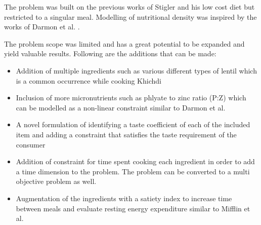 \documentclass[
]{article}
\begin{document}
The problem was built on the previous works of Stigler \cite{stigler_1945} and his low cost diet but restricted to a singular meal. 
Modelling of nutritional density was inspired by the works of Darmon et al. \cite{darmon_ferguson_briend_2002}. 

The problem scope was limited and has a great potential to be expanded and yield valuable results. Following are the additions that can be made:
\begin{itemize}
	\item Addition of multiple ingredients such as various different types of lentil which is a common occurrence while cooking Khichdi
	\item Inclusion of more micronutrients such as phlyate to zinc ratio (P:Z) which can be modelled as a non-linear constraint similar to Darmon et al. \cite{darmon_ferguson_briend_2002}
	\item A novel formulation of identifying a taste coefficient of each of the included item and adding a constraint that satisfies the taste requirement of the consumer
	\item Addition of constraint for time spent cooking each ingredient in order to add a time dimension to the problem. The problem can be converted to a multi objective problem as well.
	\item Augmentation of the ingredients with a satiety index to increase time between meals and evaluate resting energy expenditure similar to Mifflin et al. \cite{mifflin_stjeor_hill_scott_daugherty_koh_1990}
\end{itemize}
\printbibliography
\end{document}
